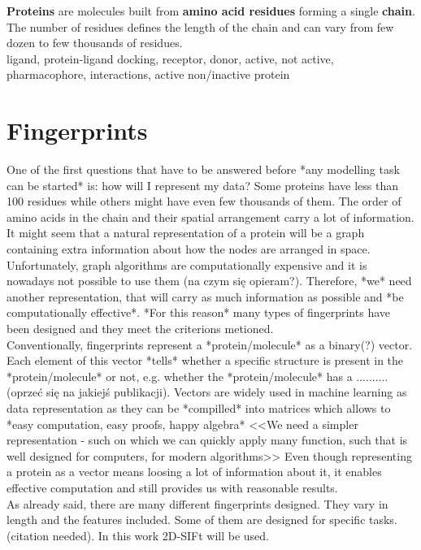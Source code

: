 \documentclass[a4paper,10pt]{report}
\begin{document}
    \textbf{Proteins} are molecules built from \textbf{amino acid residues} forming a single \textbf{chain}. The number of residues defines the length of the chain and can vary from few dozen to few thousands of residues.\\
    
        
    ligand, protein-ligand docking, receptor, donor, active, not active, pharmacophore, interactions, active non/inactive protein\\ %
    \section{Fingerprints} %
    One of the first questions that have to be answered before *any modelling task can be started* is: how will I represent my data? Some proteins have less than 100 residues while others might have even few thousands of them. The order of amino acids in the chain and their spatial arrangement carry a lot of information. It might seem that a natural representation of a protein will be a graph containing extra information about how the nodes are arranged in space. Unfortunately, graph algorithms are computationally expensive and it is nowadays not possible to use them (na czym się opieram?). Therefore, *we* need another representation, that will carry as much information as possible and *be computationally effective*. *For this reason* many types of fingerprints have been designed and they meet the criterions metioned.\\
    
    Conventionally, fingerprints represent a *protein/molecule* as a binary(?) vector. Each element of this vector *tells* whether a specific structure is present in the *protein/molecule* or not, e.g. whether the *protein/molecule* has a .......... (oprzeć się na jakiejś publikacji). Vectors are widely used in machine learning as data representation as they can be *compilled* into matrices which allows to *easy computation, easy proofs, happy algebra* <<We need a simpler representation - such on which we can quickly apply many function, such that is well designed for computers, for modern algorithms>> Even though representing a protein as a vector means loosing a lot of information about it, it enables effective computation and still provides us with reasonable results.\\
    
    As already said, there are many different fingerprints designed. They vary in length and the features included. Some of them are designed for specific tasks. (citation needed). In this work 2D-SIFt will be used.\\
  
\end{document}
